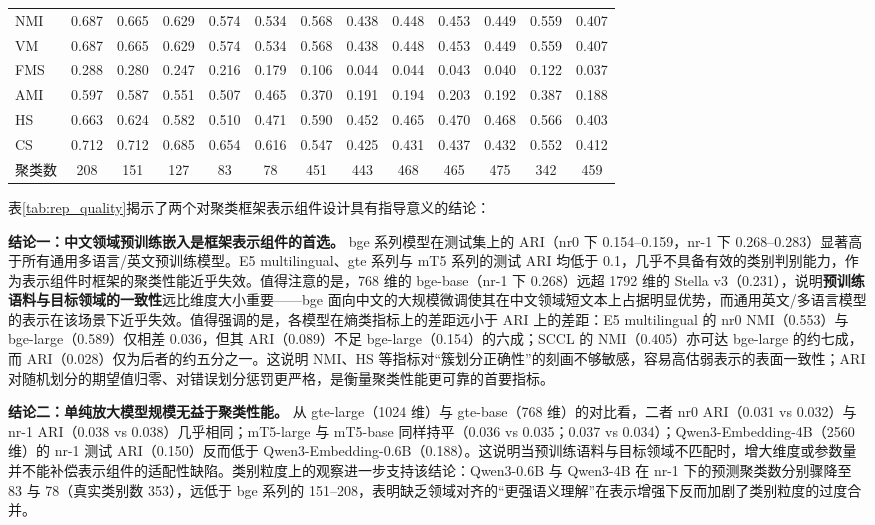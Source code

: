 \documentclass[10.5pt,compsoc,UTF8]{CjC}
\theoremstyle{mystyle}
\begin{document}
\begin{table}[htbp]
\begin{adjustbox}{width=\textwidth}
\begin{tabular}{lcccccccccccc}
NMI & 0.687 & 0.665 & 0.629 & 0.574 & 0.534 & 0.568 & 0.438 & 0.448 & 0.453 & 0.449 & 0.559 & 0.407 \\
VM & 0.687 & 0.665 & 0.629 & 0.574 & 0.534 & 0.568 & 0.438 & 0.448 & 0.453 & 0.449 & 0.559 & 0.407 \\
FMS & 0.288 & 0.280 & 0.247 & 0.216 & 0.179 & 0.106 & 0.044 & 0.044 & 0.043 & 0.040 & 0.122 & 0.037 \\
AMI & 0.597 & 0.587 & 0.551 & 0.507 & 0.465 & 0.370 & 0.191 & 0.194 & 0.203 & 0.192 & 0.387 & 0.188 \\
HS & 0.663 & 0.624 & 0.582 & 0.510 & 0.471 & 0.590 & 0.452 & 0.465 & 0.470 & 0.468 & 0.566 & 0.403 \\
CS & 0.712 & 0.712 & 0.685 & 0.654 & 0.616 & 0.547 & 0.425 & 0.431 & 0.437 & 0.432 & 0.552 & 0.412 \\
聚类数 & 208 & 151 & 127 & 83 & 78 & 451 & 443 & 468 & 465 & 475 & 342 & 459 \\
\bottomrule
\end{tabular}
\end{adjustbox}
\end{table}

表\ref{tab:rep_quality}揭示了两个对聚类框架表示组件设计具有指导意义的结论：

\textbf{结论一：中文领域预训练嵌入是框架表示组件的首选。} bge 系列模型在测试集上的 ARI（nr0 下 0.154--0.159，nr-1 下 0.268--0.283）显著高于所有通用多语言/英文预训练模型。E5 multilingual、gte 系列与 mT5 系列的测试 ARI 均低于 0.1，几乎不具备有效的类别判别能力，作为表示组件时框架的聚类性能近乎失效。值得注意的是，768 维的 bge-base（nr-1 下 0.268）远超 1792 维的 Stella v3（0.231），说明\textbf{预训练语料与目标领域的一致性}远比维度大小重要——bge 面向中文的大规模微调使其在中文领域短文本上占据明显优势，而通用英文/多语言模型的表示在该场景下近乎失效。值得强调的是，各模型在熵类指标上的差距远小于 ARI 上的差距：E5 multilingual 的 nr0 NMI（0.553）与 bge-large（0.589）仅相差 0.036，但其 ARI（0.089）不足 bge-large（0.154）的六成；SCCL 的 NMI（0.405）亦可达 bge-large 的约七成，而 ARI（0.028）仅为后者的约五分之一。这说明 NMI、HS 等指标对``簇划分正确性''的刻画不够敏感，容易高估弱表示的表面一致性；ARI 对随机划分的期望值归零、对错误划分惩罚更严格，是衡量聚类性能更可靠的首要指标。

\textbf{结论二：单纯放大模型规模无益于聚类性能。} 从 gte-large（1024 维）与 gte-base（768 维）的对比看，二者 nr0 ARI（0.031 vs 0.032）与 nr-1 ARI（0.038 vs 0.038）几乎相同；mT5-large 与 mT5-base 同样持平（0.036 vs 0.035；0.037 vs 0.034）；Qwen3-Embedding-4B（2560 维）的 nr-1 测试 ARI（0.150）反而低于 Qwen3-Embedding-0.6B（0.188）。这说明当预训练语料与目标领域不匹配时，增大维度或参数量并不能补偿表示组件的适配性缺陷。类别粒度上的观察进一步支持该结论：Qwen3-0.6B 与 Qwen3-4B 在 nr-1 下的预测聚类数分别骤降至 83 与 78（真实类别数 353），远低于 bge 系列的 151--208，表明缺乏领域对齐的``更强语义理解''在表示增强下反而加剧了类别粒度的过度合并。
\end{document}
